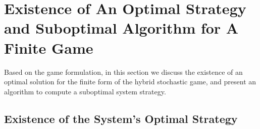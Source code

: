 \section{Existence of An Optimal Strategy and Suboptimal Algorithm for A Finite Game}
\label{sec:algorithm_finite}

Based on the game formulation, in this section we discuss the existence of an optimal solution for the finite form of the hybrid stochastic game, and present an algorithm to compute a suboptimal system strategy.%
 
\subsection{Existence of the System's Optimal Strategy}

